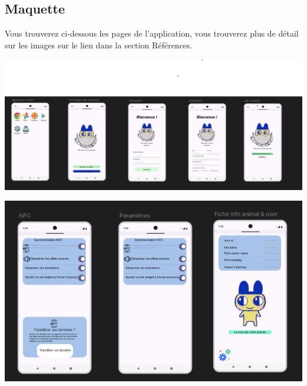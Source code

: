 \documentclass{cahier_des_charges}
\begin{document}
\subsection{Maquette}
Vous trouverez ci-dessous les pages de l'application, vous trouverez plus de détail sur les images sur le lien dans la section Références.
\newpage
\noindent
\begin{minipage}[t]{0.48\textwidth}
    \includegraphics[width=\linewidth]{maquette/screen1.png}
\end{minipage}
\hfill
\begin{minipage}[t]{0.48\textwidth}
    \includegraphics[width=\linewidth]{maquette/screen8.png}
\end{minipage}\par\vspace{0.3cm}
\end{document}

